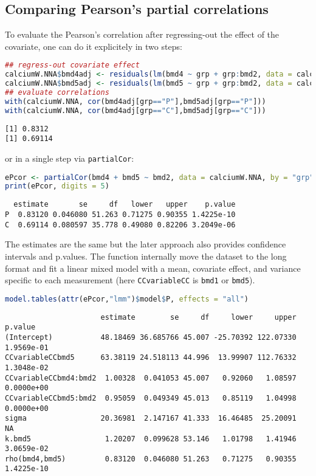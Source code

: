 \documentclass[12pt]{article}
\begin{document}
\clearpage
\subsection{Comparing Pearson's partial correlations}
\label{sec:org9fd2565}

To evaluate the Pearson's correlation after regressing-out the effect
of the covariate, one can do it explicitely in two steps:
\begin{lstlisting}[language=r,numbers=none]
## regress-out covariate effect
calciumW.NNA$bmd4adj <- residuals(lm(bmd4 ~ grp + grp:bmd2, data = calciumW.NNA))
calciumW.NNA$bmd5adj <- residuals(lm(bmd5 ~ grp + grp:bmd2, data = calciumW.NNA))
## evaluate correlations
with(calciumW.NNA, cor(bmd4adj[grp=="P"],bmd5adj[grp=="P"]))
with(calciumW.NNA, cor(bmd4adj[grp=="C"],bmd5adj[grp=="C"]))
\end{lstlisting}

\label{}
\begin{verbatim}
[1] 0.8312
[1] 0.69114
\end{verbatim}


or in a single step via \texttt{partialCor}:
\begin{lstlisting}[language=r,numbers=none]
ePcor <- partialCor(bmd4 + bmd5 ~ bmd2, data = calciumW.NNA, by = "grp")
print(ePcor, digits = 5)
\end{lstlisting}

\label{}
\begin{verbatim}
  estimate       se     df   lower   upper    p.value
P  0.83120 0.046080 51.263 0.71275 0.90355 1.4225e-10
C  0.69114 0.080597 35.778 0.49080 0.82206 3.2049e-06
\end{verbatim}


The estimates are the same but the later approach also provides
confidence intervals and p.values. The function internally move the
dataset to the long format and fit a linear mixed model with a mean,
covariate effect, and variance specific to each measurement (here
\texttt{CCvariableCC} is \texttt{bmd1} or \texttt{bmd5}).
\begin{lstlisting}[language=r,numbers=none]
model.tables(attr(ePcor,"lmm")$model$P, effects = "all")
\end{lstlisting}

\label{}
\begin{verbatim}
                      estimate        se     df     lower     upper    p.value
(Intercept)           48.18469 36.685766 45.007 -25.70392 122.07330 1.9569e-01
CCvariableCCbmd5      63.38119 24.518113 44.996  13.99907 112.76332 1.3048e-02
CCvariableCCbmd4:bmd2  1.00328  0.041053 45.007   0.92060   1.08597 0.0000e+00
CCvariableCCbmd5:bmd2  0.95059  0.049349 45.013   0.85119   1.04998 0.0000e+00
sigma                 20.36981  2.147167 41.333  16.46485  25.20091         NA
k.bmd5                 1.20207  0.099628 53.146   1.01798   1.41946 3.0659e-02
rho(bmd4,bmd5)         0.83120  0.046080 51.263   0.71275   0.90355 1.4225e-10
\end{verbatim}
\end{document}
